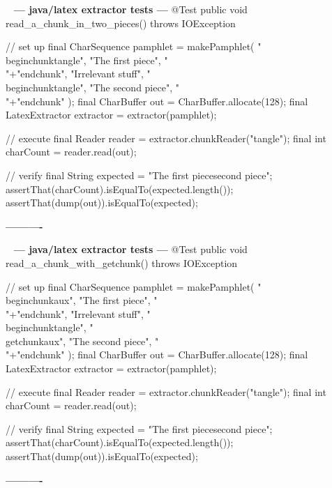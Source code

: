 \documentclass{book}
\newenvironment{chunk}[1]{%
{\ }\newline\noindent%
\hbox{\hskip 2.0cm}{\bf --- #1 ---}%
\verbatim}%                               say exactly what we see
{\endverbatim%
\par{}%
\noindent{}%
\hbox{\hskip 2.0cm}{\bf ----------}%
\par%
\normalsize\noindent}%
\providecommand{\getchunk}[1]{%
\noindent%
{\small $\backslash{}$begin\{chunk\}\{{\bf #1}\}}%
\index{{#1}}}
\begin{document}
\begin{chunk}{java/latex extractor tests}
@Test
public void read_a_chunk_in_two_pieces() throws IOException {
    // set up
    final CharSequence pamphlet = makePamphlet(
            "\\begin{chunk}{tangle}",
            "The first piece",
            "\\"+"end{chunk}",
            "Irrelevant stuff",
            "\\begin{chunk}{tangle}",
            "The second piece",
            "\\"+"end{chunk}"
    );
    final CharBuffer out = CharBuffer.allocate(128);
    final LatexExtractor extractor = extractor(pamphlet);

    // execute
    final Reader reader = extractor.chunkReader("tangle");
    final int charCount = reader.read(out);

    // verify
    final String expected = "The first piece\nThe second piece\n";
    assertThat(charCount).isEqualTo(expected.length());
    assertThat(dump(out)).isEqualTo(expected);
}
\end{chunk}

\begin{chunk}{java/latex extractor tests}
@Test
public void read_a_chunk_with_getchunk() throws IOException {
    // set up
    final CharSequence pamphlet = makePamphlet(
            "\\begin{chunk}{aux}",
            "The first piece",
            "\\"+"end{chunk}",
            "Irrelevant stuff",
            "\\begin{chunk}{tangle}",
            "\\getchunk{aux}",
            "The second piece",
            "\\"+"end{chunk}"
    );
    final CharBuffer out = CharBuffer.allocate(128);
    final LatexExtractor extractor = extractor(pamphlet);

    // execute
    final Reader reader = extractor.chunkReader("tangle");
    final int charCount = reader.read(out);

    // verify
    final String expected = "The first piece\nThe second piece\n";
    assertThat(charCount).isEqualTo(expected.length());
    assertThat(dump(out)).isEqualTo(expected);
}
\end{chunk}
\end{document}
